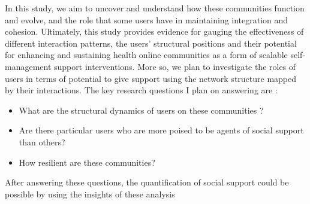 In this study, we aim to uncover and understand how these communities function and evolve, and the role that some users have in maintaining integration and cohesion. Ultimately, this study provides evidence for gauging the effectiveness of different interaction patterns, the users’ structural positions and their potential for enhancing and sustaining health online communities as a form of scalable self-management support interventions. More so, we plan to investigate the roles of users in terms of potential to give support using the network structure mapped by their interactions. 
The key research questions I plan on answering are : 
\begin{itemize}
    \item What are the structural dynamics of users on these communities ? 
    \item Are there particular users who are more poised to be agents of social support than others? 
    \item How resilient are these communities? 
\end{itemize}
After answering these questions, the quantification of social support could be possible by using the insights of these analysis


